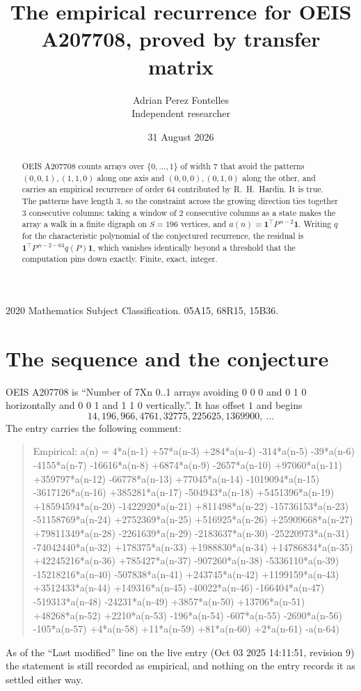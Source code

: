 \documentclass[11pt,a4paper]{article}
\title{The empirical recurrence for OEIS A207708, proved by transfer matrix}
\author{Adrian Perez Fontelles\\ \small Independent researcher}
\date{31 August 2026}
\theoremstyle{plain}
\theoremstyle{definition}
\begin{document}
\maketitle

\begin{abstract}
OEIS A207708 counts arrays over $\{0,\dots,1\}$ of width $7$ that avoid the patterns
$(0,0,1), (1,1,0)$ along one axis and $(0,0,0), (0,1,0)$ along the other, and carries an empirical recurrence of
order $64$ contributed by R.~H.~Hardin. It is true. The patterns have length $3$, so
the constraint across the growing direction ties together $3$ consecutive columns: taking a
window of $2$ consecutive columns as a state makes the array a walk in a finite digraph
on $S=196$ vertices, and $a(n)=\mathbf{1}^{\!\top}P^{\,n-2}\mathbf{1}$. Writing $q$
for the characteristic polynomial of the conjectured recurrence, the residual is
$\mathbf{1}^{\!\top}P^{\,n-2-64}q(P)\mathbf{1}$, which vanishes identically
beyond a threshold that the computation pins down exactly. Finite, exact, integer.
\end{abstract}

\noindent\small 2020 Mathematics Subject Classification. 05A15, 68R15, 15B36.\normalsize

\section{The sequence and the conjecture}

OEIS A207708 is ``Number of 7Xn 0..1 arrays avoiding 0 0 0 and 0 1 0 horizontally and 0 0 1 and 1 1 0 vertically.''. It has offset
$1$ and begins
\[
14, 196, 966, 4761, 32775, 225625, 1369900,\ \dots
\]
The entry carries the following comment:
\begin{quote}\small
Empirical: a(n) = 4*a(n-1) +57*a(n-3) +284*a(n-4) -314*a(n-5) -39*a(n-6) -4155*a(n-7) -16616*a(n-8) +6874*a(n-9) -2657*a(n-10) +97060*a(n-11) +359797*a(n-12) -66778*a(n-13) +77045*a(n-14) -1019094*a(n-15) -3617126*a(n-16) +385281*a(n-17) -504943*a(n-18) +5451396*a(n-19) +18594594*a(n-20) -1422920*a(n-21) +811498*a(n-22) -15736153*a(n-23) -51158769*a(n-24) +2752369*a(n-25) +516925*a(n-26) +25909668*a(n-27) +79811349*a(n-28) -2261639*a(n-29) -2183637*a(n-30) -25220973*a(n-31) -74042440*a(n-32) +178375*a(n-33) +1988830*a(n-34) +14786834*a(n-35) +42245216*a(n-36) +785427*a(n-37) -907260*a(n-38) -5336110*a(n-39) -15218216*a(n-40) -507838*a(n-41) +243745*a(n-42) +1199159*a(n-43) +3512433*a(n-44) +149316*a(n-45) -40022*a(n-46) -166404*a(n-47) -519313*a(n-48) -24231*a(n-49) +3857*a(n-50) +13706*a(n-51) +48268*a(n-52) +2210*a(n-53) -196*a(n-54) -607*a(n-55) -2690*a(n-56) -105*a(n-57) +4*a(n-58) +11*a(n-59) +81*a(n-60) +2*a(n-61) -a(n-64)
\end{quote}
As of the ``Last modified'' line on the live entry (Oct 03 2025 14:11:51, revision
9) the statement is still recorded as empirical, and nothing on the entry
records it as settled either way.
\end{document}
